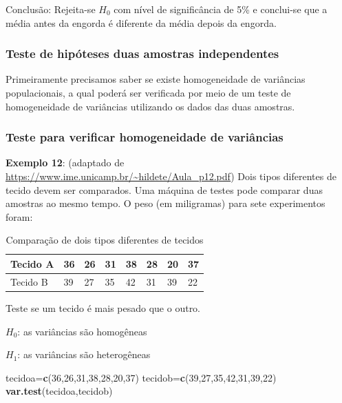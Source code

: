 \documentclass[12pt,brazil,oneside]{book}
\newenvironment{Shaded}{\begin{snugshade}}{\end{snugshade}}
\newcommand{\DecValTok}[1]{\textcolor[rgb]{0.00,0.00,0.81}{#1}}
\newcommand{\KeywordTok}[1]{\textcolor[rgb]{0.13,0.29,0.53}{\textbf{#1}}}
\newcommand{\NormalTok}[1]{#1}
\begin{document}
Conclusão: Rejeita-se \(H_0\) com nível de significância de 5\% e conclui-se que a média antes da engorda é diferente da média depois da engorda.

\hypertarget{teste-de-hipoteses-duas-amostras-independentes}{%
\subsubsection{Teste de hipóteses duas amostras independentes}\label{teste-de-hipoteses-duas-amostras-independentes}}

Primeiramente precisamos saber se existe homogeneidade de variâncias populacionais, a qual poderá ser verificada por meio de um teste de homogeneidade de variâncias utilizando os dados das duas amostras.

\hypertarget{teste-para-verificar-homogeneidade-de-variancias}{%
\subsubsection{Teste para verificar homogeneidade de variâncias}\label{teste-para-verificar-homogeneidade-de-variancias}}

\textbf{Exemplo 12}: (adaptado de \url{https://www.ime.unicamp.br/~hildete/Aula_p12.pdf}) Dois tipos diferentes de tecido devem ser comparados. Uma máquina de testes pode comparar duas amostras ao mesmo tempo. O peso (em miligramas) para sete experimentos foram:

\begin{table}[t]

\caption{\label{tab:unnamed-chunk-126}Comparação de dois tipos diferentes de tecidos}
\centering
\begin{tabular}{l|l|l|l|l|l|l|l}
\hline
Tecido A & 36 & 26 & 31 & 38 & 28 & 20 & 37\\
\hline
Tecido B & 39 & 27 & 35 & 42 & 31 & 39 & 22\\
\hline
\end{tabular}
\end{table}

Teste se um tecido é mais pesado que o outro.

\textbf{\(H_0\)}: as variâncias são homogêneas

\textbf{\(H_1\)}: as variâncias são heterogêneas

\begin{Shaded}
\begin{Highlighting}[]
\NormalTok{tecidoa=}\KeywordTok{c}\NormalTok{(}\DecValTok{36}\NormalTok{,}\DecValTok{26}\NormalTok{,}\DecValTok{31}\NormalTok{,}\DecValTok{38}\NormalTok{,}\DecValTok{28}\NormalTok{,}\DecValTok{20}\NormalTok{,}\DecValTok{37}\NormalTok{)}
\NormalTok{tecidob=}\KeywordTok{c}\NormalTok{(}\DecValTok{39}\NormalTok{,}\DecValTok{27}\NormalTok{,}\DecValTok{35}\NormalTok{,}\DecValTok{42}\NormalTok{,}\DecValTok{31}\NormalTok{,}\DecValTok{39}\NormalTok{,}\DecValTok{22}\NormalTok{)}
\KeywordTok{var.test}\NormalTok{(tecidoa,tecidob)}
\end{Highlighting}
\end{Shaded}
\end{document}
